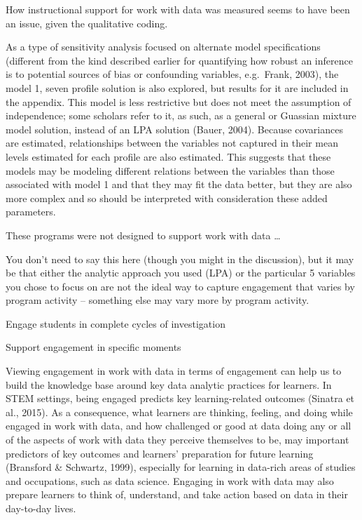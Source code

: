 \documentclass[]{msu-thesis}
\theoremstyle{definition}
\theoremstyle{definition}
\theoremstyle{definition}
\theoremstyle{remark}
\begin{document}
How instructional support for work with data was measured seems to have
been an issue, given the qualitative coding.

As a type of sensitivity analysis focused on alternate model
specifications (different from the kind described earlier for
quantifying how robust an inference is to potential sources of bias or
confounding variables, e.g.~Frank, 2003), the model 1, seven profile
solution is also explored, but results for it are included in the
appendix. This model is less restrictive but does not meet the
assumption of independence; some scholars refer to it, as such, as a
general or Guassian mixture model solution, instead of an LPA solution
(Bauer, 2004). Because covariances are estimated, relationships between
the variables not captured in their mean levels estimated for each
profile are also estimated. This suggests that these models may be
modeling different relations between the variables than those associated
with model 1 and that they may fit the data better, but they are also
more complex and so should be interpreted with consideration these added
parameters.

These programs were not designed to support work with data \ldots{}

You don't need to say this here (though you might in the discussion),
but it may be that either the analytic approach you used (LPA) or the
particular 5 variables you chose to focus on are not the ideal way to
capture engagement that varies by program activity -- something else may
vary more by program activity.

Engage students in complete cycles of investigation

Support engagement in specific moments

Viewing engagement in work with data in terms of engagement can help us
to build the knowledge base around key data analytic practices for
learners. In STEM settings, being engaged predicts key learning-related
outcomes (Sinatra et al., 2015). As a consequence, what learners are
thinking, feeling, and doing while engaged in work with data, and how
challenged or good at data doing any or all of the aspects of work with
data they perceive themselves to be, may important predictors of key
outcomes and learners' preparation for future learning (Bransford \&
Schwartz, 1999), especially for learning in data-rich areas of studies
and occupations, such as data science. Engaging in work with data may
also prepare learners to think of, understand, and take action based on
data in their day-to-day lives.
\end{document}
